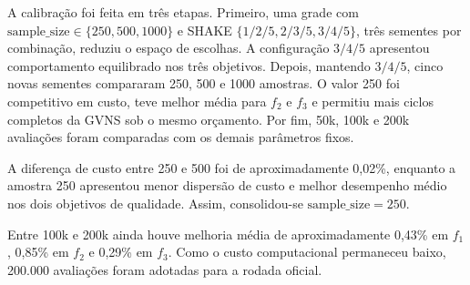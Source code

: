 \documentclass[10pt,twocolumn,a4paper]{article}
\begin{document}
A calibração foi feita em três etapas. Primeiro, uma grade com $\text{sample\_size} \in \{250, 500, 1000\}$ e SHAKE $\{1/2/5, 2/3/5, 3/4/5\}$, três sementes por combinação, reduziu o espaço de escolhas. A configuração $3/4/5$ apresentou comportamento equilibrado nos três objetivos. Depois, mantendo $3/4/5$, cinco novas sementes compararam 250, 500 e 1000 amostras. O valor 250 foi competitivo em custo, teve melhor média para $f_2$ e $f_3$ e permitiu mais ciclos completos da GVNS sob o mesmo orçamento. Por fim, 50k, 100k e 200k avaliações foram comparadas com os demais parâmetros fixos.

\begin{table}[H]
\centering
\caption{Calibração confirmatória de sample\_size (50k avaliações, SHAKE 3/4/5, cinco seeds).}
\label{tab:calib_sample}
\end{table}

A diferença de custo entre 250 e 500 foi de aproximadamente 0,02\%, enquanto a amostra 250 apresentou menor dispersão de custo e melhor desempenho médio nos dois objetivos de qualidade. Assim, consolidou-se $\text{sample\_size} = 250$.

\begin{table}[H]
\centering
\caption{Médias na calibração do orçamento (cinco seeds).}
\label{tab:calib_budget}
\end{table}

Entre 100k e 200k ainda houve melhoria média de aproximadamente 0,43\% em $f_1$, 0,85\% em $f_2$ e 0,29\% em $f_3$. Como o custo computacional permaneceu baixo, 200.000 avaliações foram adotadas para a rodada oficial.
\end{document}
